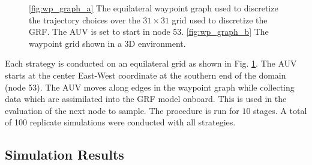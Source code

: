 \documentclass[aoas]{imsart}
\begin{document}
\begin{figure}[!h] 
\centering 
{}
\hfill
{}
\caption{\ref{fig:wp_graph_a} The equilateral waypoint graph used to discretize the
trajectory choices over the $31\times31$ grid used to discretize the GRF. The AUV is set to start in node $53$.
\ref{fig:wp_graph_b} The waypoint grid shown in a 3D environment.}
\label{fig:wp_graph}
\end{figure}

Each strategy is conducted on an equilateral grid as shown in
Fig. \ref{fig:wp_graph}. The AUV starts at the
center East-West coordinate at the southern end of the domain (node 53). The
AUV moves along edges in the waypoint graph while collecting data which are assimilated into the GRF model onboard. This is used in the
evaluation of the next node to sample.
The procedure is run for $10$ stages. A total of 100 replicate simulations were conducted with all
strategies.

\subsection{Simulation Results}
\end{document}
